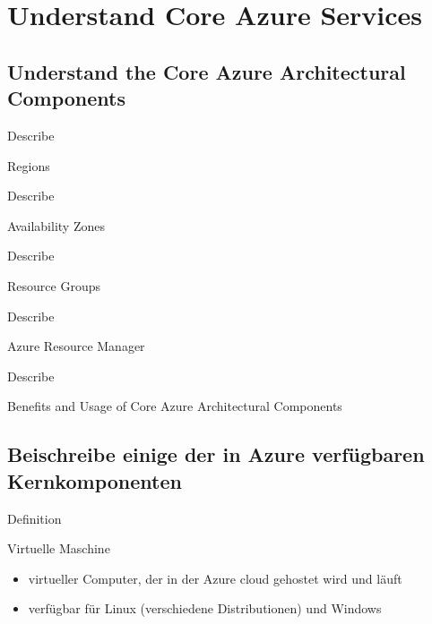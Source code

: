 \documentclass{scrartcl}
\newenvironment{flashcard}[2][]{%
    #1
    \vfill
    \centerline{\Large{#2}}
    \vfill
\newpage
}
{\newpage}
\newcommand{\sectioncard}[1]{
    \vspace*{\stretch{1}}
    \section{#1}
    \vspace*{\stretch{1}}
    \pagebreak
}
\newcommand{\subsectioncard}[1]{
    \vspace*{\stretch{1}}
    \subsection{#1}
    \vspace*{\stretch{1}}
    \pagebreak
}
\begin{document}
    \sectioncard{Understand Core Azure Services}

    \subsectioncard{Understand the Core Azure Architectural Components}

    \begin{flashcard}[Describe]{Regions}

    \end{flashcard}

    \begin{flashcard}[Describe]{Availability Zones}

    \end{flashcard}

    \begin{flashcard}[Describe]{Resource Groups}

    \end{flashcard}

    \begin{flashcard}[Describe]{Azure Resource Manager}

    \end{flashcard}

    \begin{flashcard}[Describe]{Benefits and Usage of Core Azure Architectural Components}

    \end{flashcard}

    \subsectioncard{Beischreibe einige der in Azure verfügbaren Kernkomponenten}

    \begin{flashcard}[Definition]{Virtuelle Maschine}
        \begin{itemize}
            \item virtueller Computer, der in der Azure cloud gehostet wird und läuft
            \item verfügbar für Linux (verschiedene Distributionen) und Windows
        \end{itemize}
    \end{flashcard}
\end{document}
